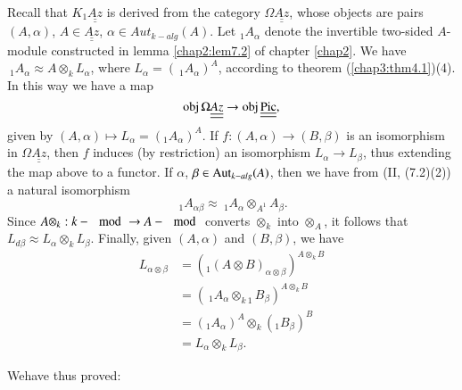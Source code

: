 Recall that $K_1\underline{\underline{Az}}$ is derived from the
category $\Omega\underline{\underline{Az}}$, whose objects are pairs
$(A, \alpha)$, $A \in \underline{\underline{Az}}$, $\alpha \in Aut_{
  k - alg}(A)$. Let ${}_1A_\alpha$ denote the invertible two-sided
$A$-module constructed in lemma \ref{chap2:lem7.2} of chapter
\ref{chap2}. We have $~_1 
A_\alpha \approx A \otimes_k L_\alpha$, where $L_\alpha = (~_1
A_\alpha)^A$, according to theorem (\ref{chap3:thm4.1})(4). In this
way we have a map   
$$
\operatorname{obj} \Omega \underline{\underline{Az}} \to \operatorname{obj}
\underline{\underline{\operatorname{Pic}}}, 
$$
given by $(A, \alpha) \mapsto L_\alpha = ({}_1 A_\alpha)^A$. If $f :
(A, \alpha) \to (B, \beta) $ is an isomorphism in $\Omega
\underline{\underline{Az}}$, then $f$ induces (by restriction) an
isomorphism $L_\alpha \to L_\beta$, thus extending the map above to a
functor. If $\alpha$, $\beta \in \operatorname{Aut}_{k-alg} (A)$, then we have
from (II, (7.2)(2)) a natural isomorphism  
$$
~_1 A_{\alpha \beta} \approx ~_1 A_\alpha \otimes_{A^1} A_\beta.  
$$
Since $A \otimes _k : k - \mod \to A - \mod$ converts $\otimes_k$ into
$\otimes_A$, it follows that $L_{ d \beta} \approx L_\alpha \otimes_k 
L_\beta$. Finally, given $(A, \alpha)$ and $(B, \beta)$, we have  
\begin{align*}
L_{\alpha \otimes \beta} & = (_1 ( A \otimes B)_{\alpha \otimes
  \beta})^{ A \otimes_k B} \\ 
& = (~_1 A_\alpha \otimes_{k ~ 1} B_\beta )^{ A \otimes_k B}\\
& = (_1 A_\alpha)^A \otimes_{k}(_1 B_\beta )^B \\
& = L_\alpha \otimes_k L_\beta. 
\end{align*}

We\pageoriginale have thus proved: 


